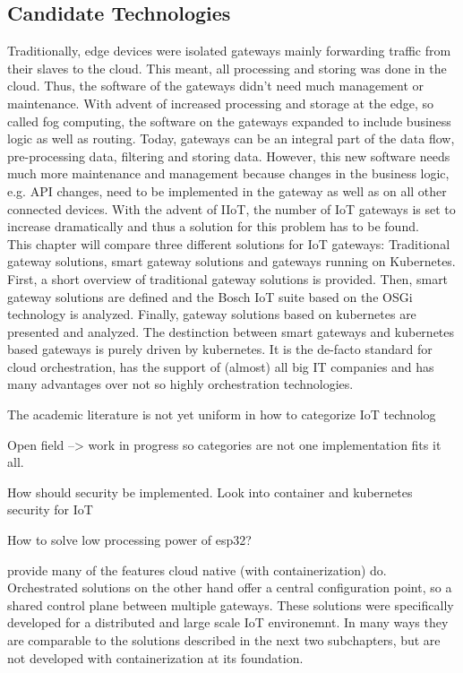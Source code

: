 \subsection{Candidate Technologies}
Traditionally, edge devices were isolated gateways mainly forwarding traffic from their slaves to the cloud. This meant, all processing and storing was done in the cloud. Thus, the software of the gateways didn't need much management or maintenance. With advent of increased processing and storage at the edge, so called fog computing, the software on the gateways expanded to include business logic as well as routing. Today, gateways can be an integral part of the data flow, pre-processing data, filtering and storing data. However, this new software needs much more maintenance and management because changes in the business logic, e.g. API changes, need to be implemented in the gateway as well as on all other connected devices. With the advent of IIoT, the number of IoT gateways is set to increase dramatically and thus a solution for this problem has to be found.\\ This chapter will compare three different solutions for IoT gateways: Traditional gateway solutions, smart gateway solutions and gateways running on Kubernetes. First, a short overview of traditional gateway solutions is provided. Then, smart gateway solutions are defined and the Bosch IoT suite based on the OSGi technology is analyzed. Finally, gateway solutions based on kubernetes are presented and analyzed. The destinction between smart gateways and kubernetes based gateways is purely driven by kubernetes. It is the de-facto standard for cloud orchestration, has the support of (almost) all big IT companies and has many advantages over not so highly orchestration technologies.



The academic literature is not yet uniform in how to categorize IoT technolog

Open field --> work in progress so categories are not one implementation fits it all.

How should security be implemented.
Look into container and kubernetes security for IoT

How to solve low processing power of esp32?


provide many of the features cloud native (with containerization) do. Orchestrated solutions on the other hand offer a central configuration point, so a shared control plane between multiple gateways. These solutions were specifically developed for a distributed and large scale IoT environemnt. In many ways they are comparable to the solutions described in the next two subchapters, but are not developed with containerization at its foundation.

